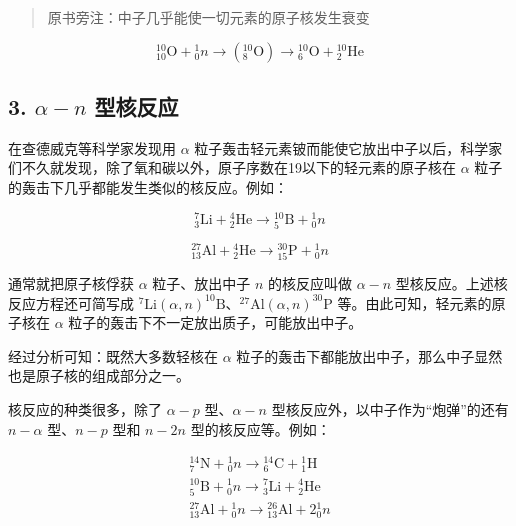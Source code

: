 \begin{quote}
原书旁注：中子几乎能使一切元素的原子核发生衰变
\end{quote}

\[
{ } _ { 10 } ^ { 10 } \mathrm{O} + { } _ { 0 } ^ { 1 } n \longrightarrow ( { } _ { 8 } ^ { 10 } \mathrm{O} ) \longrightarrow { } _ { 6 } ^ { 10 } \mathrm{O} + { } _ { 2 } ^ { 10 } \mathrm{He}
\]

\subsection{\texorpdfstring{3. \(\alpha - n\)
型核反应}{3. \textbackslash alpha - n 型核反应}}\label{alpha---n-ux578bux6838ux53cdux5e94}

在查德威克等科学家发现用 \(\alpha\)
粒子轰击轻元素铍而能使它放出中子以后，科学家们不久就发现，除了氧和碳以外，原子序数在19以下的轻元素的原子核在
\(\alpha\) 粒子的轰击下几乎都能发生类似的核反应。例如：

\[
{ } _ {3}^{7}\mathrm{Li}+{ } _ {2}^{4}\mathrm{He}\longrightarrow { } _ {5}^{10}\mathrm{B}+{ } _ {0}^{1}n
\]

\[
{ } _ {13}^{27}\mathrm{Al}+{ } _ {2}^{4}\mathrm{He}\longrightarrow { } _ {15}^{30}\mathrm{P}+{ } _ {0}^{1}n
\]

通常就把原子核俘获 \(\alpha\) 粒子、放出中子 \(n\) 的核反应叫做
\(\alpha - n\) 型核反应。上述核反应方程还可简写成
\(^7\mathrm{Li}(\alpha, n)^{10}\mathrm{B}\)、\(^{27}\mathrm{Al}(\alpha, n)^{30}\mathrm{P}\)
等。由此可知，轻元素的原子核在 \(\alpha\)
粒子的轰击下不一定放出质子，可能放出中子。

经过分析可知：既然大多数轻核在 \(\alpha\)
粒子的轰击下都能放出中子，那么中子显然也是原子核的组成部分之一。

核反应的种类很多，除了 \(\alpha - p\) 型、\(\alpha - n\)
型核反应外，以中子作为``炮弹''的还有 \(n - \alpha\) 型、\(n - p\) 型和
\(n - 2n\) 型的核反应等。例如：

\[
\begin{array}{l} {} ^ {14} _ {7} \mathrm{N} + {} _ {0} ^ {1} n \longrightarrow {} ^ {14} _ {6} \mathrm{C} + {} _ {1} ^ {1} \mathrm{H} \\ {} ^ {10} _ {5} \mathrm{B} + {} _ {0} ^ {1} n \longrightarrow {} ^ {7} _ {3} \mathrm{Li} + {} _ {2} ^ {4} \mathrm{He} \\ {} ^ {27} _ {13} \mathrm{Al} + {} _ {0} ^ {1} n \longrightarrow {} ^ {26} _ {13} \mathrm{Al} + 2 {} _ {0} ^ {1} n \\ \end{array}
\]

